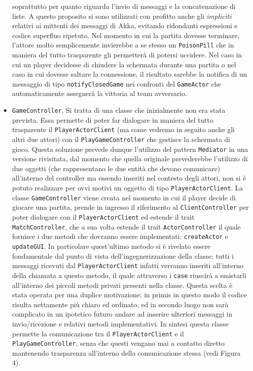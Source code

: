 \begin{itemize}
soprattutto per quanto riguarda l'invio di messaggi e la concatenazione di liste. A questo proposito si sono utilizzati con profitto anche gli \textit{impliciti} relativi ai mittenti dei messaggi di Akka, evitando ridondanti espressioni e codice superfluo ripetuto. Nel momento in cui la partita dovesse terminare, l'attore molto semplicemente invierebbe a se stesso un \texttt{PoisonPill} che in maniera del tutto trasparente gli permetterà di potersi uccidere. Nel caso in cui un player decidesse di chiudere la schermata durante una partita o nel caso in cui dovesse saltare la connessione, il risultato sarebbe la notifica di un messaggio di tipo \texttt{notifyClosedGame} nei confronti del \texttt{GameActor} che automaticamente assegnerà la vittoria al team avversario.

     \item \texttt{GameController}.
    Si tratta di una classe che inizialmente non era stata prevista. Essa permette di poter far dialogare in maniera del tutto trasparente il \texttt{PlayerActorClient} (ma come vedremo in seguito anche gli altri due attori) con il \texttt{PlayGameController} che gestisce la schermata di gioco. Questa soluzione prevede dunque l'utilizzo del pattern \texttt{Mediator} in una versione rivisitata, dal momento che quella originale prevederebbe l'utilizzo di due oggetti (che rappresentano le due entità che devono comunicare) all'interno del controller ma essendo inseriti nel contesto degli attori, non si è potuto realizzare per ovvi motivi un oggetto di tipo \texttt{PlayerActorClient}. La classe \texttt{GameController} viene creata nel momento in cui il player decide di giocare una partita, prende in ingresso il riferimento al \texttt{ClientController} per poter dialogare con il \texttt{PlayerActorClient} ed estende il trait \texttt{MatchController}, che a sua volta estende il trait \texttt{ActorController} il quale fornisce i due metodi che dovranno essere implementati: \texttt{createActor} e \texttt{updateGUI}. In particolare quest'ultimo metodo si è rivelato essere fondamentale dal punto di vista dell'ingegnerizzazione della classe: tutti i messaggi ricevuti dal \texttt{PlayerActorClient} infatti verranno inseriti all'interno della chiamata a questo metodo, il quale attraverso i \texttt{case} riuscirà a smistarli all'interno dei piccoli metodi privati presenti nella classe. Questa scelta è stata operata per una duplice motivazione: in primis in questo modo il codice risulta nettamente più chiaro ed ordinato, ed in secondo luogo non sarà complicato in un ipotetico futuro andare ad inserire ulteriori messaggi in invio/ricezione e relativi metodi implementativi. In sintesi questa classe permette la comunicazione tra il \texttt{PlayerActorClient} e il \texttt{PlayGameController}, senza che questi vengano mai a contatto diretto mantenendo trasparenza all'interno della comunicazione stessa (vedi Figura 4).


\end{itemize}
